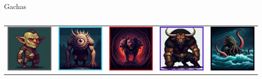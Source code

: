 \documentclass[12pt,aspectratio=169,notheorems]{beamer}
\begin{document}
\begin{frame}{Gachas}
\begin{columns}
\begin{column}{.85\textwidth}
\begin{tabular}{ccccc}
                    \includegraphics[width=.16\textwidth]{Goblin (common).jpg} &
                    \includegraphics[width=.16\textwidth]{Cyclops (non-common).jpg} & 
                    \includegraphics[width=.16\textwidth]{Cerberus (rare).jpg} &
                    \includegraphics[width=.16\textwidth]{Minotaur (epic).jpg} & 
                    \includegraphics[width=.16\textwidth]{Kraken (legendary).jpg} \\
                    

\end{tabular}
\end{column}
\end{columns}
\end{frame}
\end{document}
